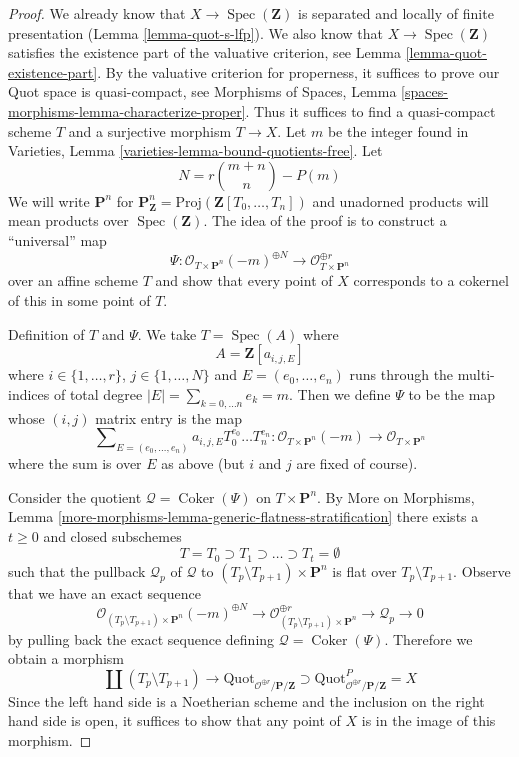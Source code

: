 \documentclass[10pt,a4paper]{amsart}
\theoremstyle{plain}
\theoremstyle{definition}
\theoremstyle{remark}
\numberwithin{equation}{subsection}
\def\Spec{\mathop{\mathrm{Spec}}}
\def\Coker{\mathop{\mathrm{Coker}}}
\def\Quotfunctor{\mathrm{Quot}}
\begin{document}
\begin{proof}
We already know that $X \to \Spec(\mathbf{Z})$ is separated and
locally of finite presentation (Lemma \ref{lemma-quot-s-lfp}).
We also know that $X \to \Spec(\mathbf{Z})$ satisfies the
existence part of the valuative criterion, see
Lemma \ref{lemma-quot-existence-part}.
By the valuative criterion for properness, it suffices to
prove our Quot space is quasi-compact, see
Morphisms of Spaces,
Lemma \ref{spaces-morphisms-lemma-characterize-proper}.
Thus it suffices to find a quasi-compact scheme $T$ and a surjective
morphism $T \to X$. Let $m$ be the integer found in
Varieties, Lemma \ref{varieties-lemma-bound-quotients-free}.
Let
$$
N = r{m + n \choose n} - P(m)
$$
We will write $\mathbf{P}^n$ for
$\mathbf{P}^n_\mathbf{Z} = \text{Proj}(\mathbf{Z}[T_0, \ldots, T_n])$
and unadorned products will mean products over $\Spec(\mathbf{Z})$.
The idea of the proof is to construct a ``universal'' map
$$
\Psi :
\mathcal{O}_{T \times \mathbf{P}^n}(-m)^{\oplus N}
\longrightarrow
\mathcal{O}_{T \times \mathbf{P}^n}^{\oplus r}
$$
over an affine scheme $T$ and show that every point of $X$
corresponds to a cokernel of this in some point of $T$.

\medskip\noindent
Definition of $T$ and $\Psi$. We take $T = \Spec(A)$ where
$$
A = \mathbf{Z}[a_{i, j, E}]
$$
where $i \in \{1, \ldots, r\}$, $j \in \{1, \ldots, N\}$
and $E = (e_0, \ldots, e_n)$ runs through the multi-indices
of total degree $|E| = \sum_{k = 0, \ldots n} e_k = m$.
Then we define $\Psi$ to be the map whose $(i, j)$ matrix
entry is the map
$$
\sum\nolimits_{E = (e_0, \ldots, e_n)}
a_{i, j, E} T_0^{e_0} \ldots T_n^{e_n} :
\mathcal{O}_{T \times \mathbf{P}^n}(-m)
\longrightarrow
\mathcal{O}_{T \times \mathbf{P}^n}
$$
where the sum is over $E$ as above (but $i$ and $j$ are fixed of course).

\medskip\noindent
Consider the quotient $\mathcal{Q} = \Coker(\Psi)$ on $T \times \mathbf{P}^n$.
By More on Morphisms, Lemma
\ref{more-morphisms-lemma-generic-flatness-stratification}
there exists a $t \geq 0$ and closed subschemes
$$
T = T_0 \supset T_1 \supset \ldots \supset T_t = \emptyset
$$
such that the pullback $\mathcal{Q}_p$ of $\mathcal{Q}$ to
$(T_p \setminus T_{p + 1}) \times \mathbf{P}^n$ is flat over
$T_p \setminus T_{p + 1}$. Observe that we
have an exact sequence
$$
\mathcal{O}_{(T_p \setminus T_{p + 1}) \times \mathbf{P}^n}(-m)^{\oplus N}
\to
\mathcal{O}_{(T_p \setminus T_{p + 1}) \times \mathbf{P}^n}^{\oplus r}
\to
\mathcal{Q}_p
\to
0
$$
by pulling back the exact sequence defining $\mathcal{Q} = \Coker(\Psi)$.
Therefore we obtain a morphism
$$
\coprod (T_p \setminus T_{p + 1})
\longrightarrow
\Quotfunctor_{\mathcal{O}^{\oplus r}/\mathbf{P}/\mathbf{Z}}
\supset
\Quotfunctor^P_{\mathcal{O}^{\oplus r}/\mathbf{P}/\mathbf{Z}} = X
$$
Since the left hand side is a Noetherian scheme and the inclusion
on the right hand side is open, it
suffices to show that any point of $X$ is in the image of this morphism.


\end{proof}
\end{document}
